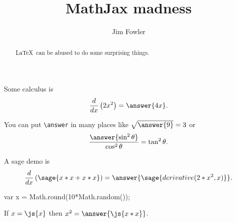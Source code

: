 \documentclass{ximera}
\title{MathJax madness}
\author{Jim Fowler}
\begin{document}
\begin{abstract}
  \LaTeX\ can be abused to do some surprising things.
\end{abstract}

\maketitle

\begin{problem}
  Some calculus is
  \[
    \frac{d}{dx} \left( 2x^2 \right) = \answer{4x}.
  \]

  You can put \verb|\answer| in many places
    like \(\sqrt{\answer{9}} = 3\)
    or \[
      \frac{\answer{\sin^2 \theta}}{\cos^2 \theta} = \tan^2 \theta.
    \]
\end{problem}


\begin{problem}
  A sage demo is
  \[
    \frac{d}{dx} \left( \sage{x*x + x*x} \right) =
      \answer{\sage{derivative(2*x^2,x)}}.
  \]
\end{problem}

\begin{javascript}
  var x = Math.round(10*Math.random());
\end{javascript}

\begin{problem}
  If $x = \js{x}$ then $x^2 = \answer{\js{x*x}}$.
\end{problem}
\end{document}
